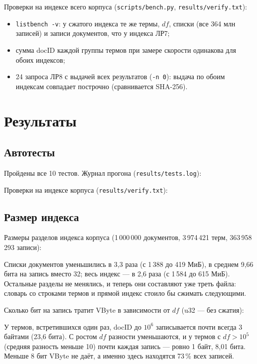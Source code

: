 Проверки на индексе всего корпуса (\texttt{scripts/bench.py}, \texttt{results/verify.txt}):
\begin{itemize}
    \item \texttt{listbench -v}: у сжатого индекса те же термы, $df$, списки (все 364 млн записей) и записи документов, что у индекса ЛР7;
    \item сумма docID каждой группы термов при замере скорости одинакова для обоих индексов;
    \item 24 запроса ЛР8 с выдачей всех результатов (\texttt{-n 0}): выдача по обоим индексам совпадает построчно (сравнивается SHA-256).
\end{itemize}

\section{Результаты}
\subsection{Автотесты}
Пройдены все 10 тестов. Журнал прогона (\texttt{results/tests.log}):

{\scriptsize
{}
}

Проверки на индексе корпуса (\texttt{results/verify.txt}):

{\scriptsize
{}
}

\subsection{Размер индекса}
Размеры разделов индекса корпуса (1\,000\,000 документов, 3\,974\,421 терм, 363\,958\,293 записи):
\begin{center}
\small

\end{center}
Списки документов уменьшились в 3,3 раза (с 1\,388 до 419 МиБ), в среднем 9,66 бита на запись вместо 32; весь индекс --- в 2,6 раза (с 1\,584 до 615 МиБ). Остальные разделы не менялись, и теперь они составляют уже треть файла: словарь со строками термов и прямой индекс стоило бы сжимать следующими.

Сколько бит на запись тратит VByte в зависимости от $df$ (u32 --- без сжатия):
\begin{center}
\footnotesize
\setlength{\tabcolsep}{4pt}

\end{center}
У термов, встретившихся один раз, docID до $10^6$ записывается почти всегда 3 байтами (23,6 бита). С ростом $df$ разности уменьшаются, и у термов с $df > 10^5$ (средняя разность меньше 10) почти каждая запись --- ровно 1 байт, 8,01 бита. Меньше 8 бит VByte не даёт, а именно здесь находятся 73\,\% всех записей.

